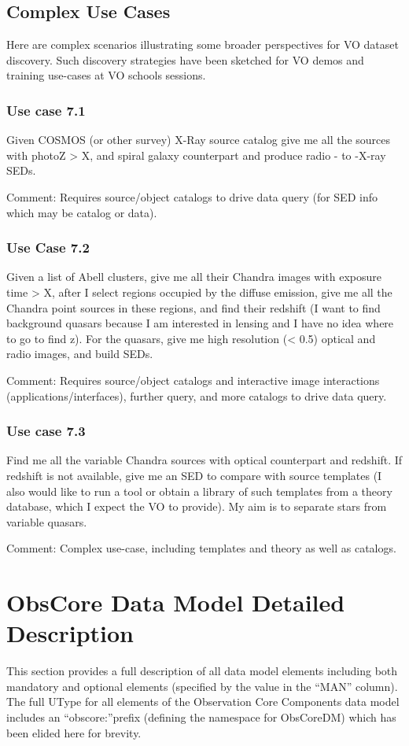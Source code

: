 \documentclass[11pt,a4paper]{ivoa}
\begin{document}
\subsection{Complex Use Cases}
Here are complex scenarios illustrating some broader perspectives for VO dataset discovery. Such discovery strategies
have been sketched for VO demos and training use-cases at VO schools sessions.

\subsubsection{Use case 7.1}
Given COSMOS (or other survey) X-Ray source catalog give me all the sources with photoZ {\textgreater} X, and spiral
galaxy counterpart and produce radio - to -X-ray SEDs.

Comment: Requires source/object catalogs to drive data query (for SED info which may be catalog or data).

\subsubsection{Use Case 7.2}
Given a list of Abell clusters, give me all their Chandra images with exposure time {\textgreater} X, after I select
regions occupied by the diffuse emission, give me all the Chandra point sources in these regions, and find their
redshift (I want to find background quasars because I am interested in lensing and I have no idea where to go to find
z). For the quasars, give me high resolution ({\textless} 0.5{\textquotedbl}) optical and radio images, and build SEDs.

Comment: Requires source/object catalogs and interactive image interactions (applications/interfaces), further query,
and more catalogs to drive data query.

\subsubsection{Use case 7.3}
Find me all the variable Chandra sources with optical counterpart and redshift. If redshift is not available, give me an
SED to compare with source templates (I also would like to run a tool or obtain a library of such templates from a
theory database, which I expect the VO to provide). My aim is to separate stars from variable quasars.

Comment: Complex use-case, including templates and theory as well as catalogs.

\section{ObsCore Data Model Detailed Description}
This section provides a full description of all data model elements including both mandatory and optional elements
(specified by the value in the ``MAN'' column).  The full UType for all elements of the Observation Core Components
data model includes an ``obscore:{}''prefix (defining the namespace for ObsCoreDM) which has been elided here for
brevity.
\end{document}
